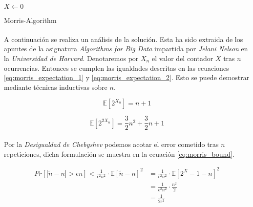 \documentclass{subfiles}
\begin{document}
      \paragraph{}
      \begin{algorithm}[h]
        \SetAlgoLined
        $X \gets 0$\;
        \caption{Morris-Algorithm}
        \label{code:morris-algorithm}
      \end{algorithm}

      \paragraph{}
      A continuación se realiza un análisis de la solución. Esta ha sido extraida de los apuntes de la asignatura \emph{Algorithms for Big Data} \cite{bigdata2015jelani} impartida por \emph{Jelani Nelson} en la \emph{Universidad de Harvard}. Denotaremos por $X_n$ el valor del contador $X$ tras $n$ ocurrencias. Entonces se cumplen las igualdades descritas en las ecuaciones \eqref{eq:morris_expectation_1} y \eqref{eq:morris_expectation_2}. Esto se puede demostrar mediante técnicas inductivas sobre $n$.

      \begin{equation}
      \label{eq:morris_expectation_1}
        \mathbb{E}[2^{X_n}] = n + 1
      \end{equation}

      \begin{equation}
      \label{eq:morris_expectation_2}
        \mathbb{E}[2^{2X_n}] = \frac{3}{2}n^2 + \frac{3}{2}n + 1
      \end{equation}

      \paragraph{}
      Por la \emph{Desigualdad de Chebyshev} podemos acotar el error cometido tras $n$ repeticiones, dicha formulación se muestra en la ecuación \eqref{eq:morris_bound}.

      \begin{align}
      \label{eq:morris_bound}
        Pr[|\widetilde{n} - n| > \epsilon n ] < \frac{1}{\epsilon^2n^2}\cdot\mathbb{E}[\widetilde{n} - n]^2
          &= \frac{1}{\epsilon^2n^2}\cdot\mathbb{E}[2^X-1-n]^2
        \\&= \frac{1}{\epsilon^2n^2}\cdot \frac{n^2}{2}
        \\&= \frac{1}{2\epsilon^2}
      \end{align}
\end{document}
